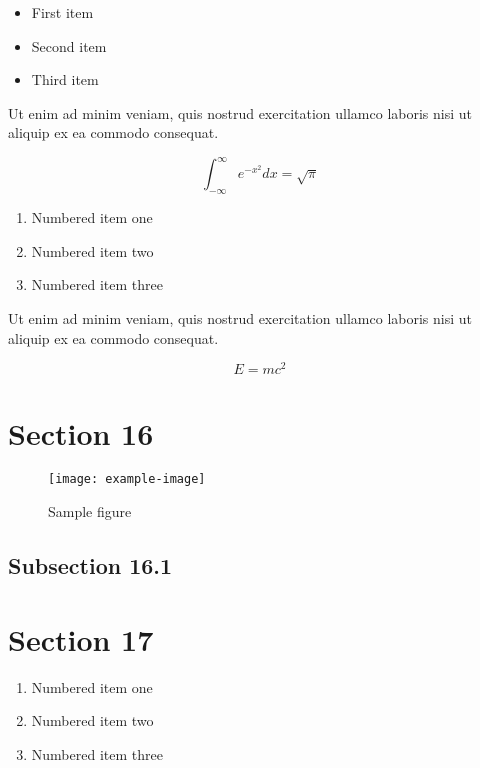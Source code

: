 \documentclass{article}
\begin{document}
\begin{itemize}
\item First item
\item Second item
\item Third item
\end{itemize}

Ut enim ad minim veniam, quis nostrud exercitation ullamco laboris nisi ut aliquip ex ea commodo consequat.

\begin{equation}
    \int_{-\infty}^{\infty} e^{-x^2} dx = \sqrt{\pi}
\end{equation}

\begin{enumerate}
\item Numbered item one
\item Numbered item two
\item Numbered item three
\end{enumerate}

Ut enim ad minim veniam, quis nostrud exercitation ullamco laboris nisi ut aliquip ex ea commodo consequat.


\begin{equation}
    E = mc^2
\end{equation}

\section{Section 16}

\begin{figure}[h]
    \centering
    \texttt{[image: example-image]}
    \caption{Sample figure}
    \label{fig:sample}
\end{figure}


\subsection{Subsection 16.1}

\section{Section 17}

\begin{enumerate}
\item Numbered item one
\item Numbered item two
\item Numbered item three
\end{enumerate}
\end{document}
